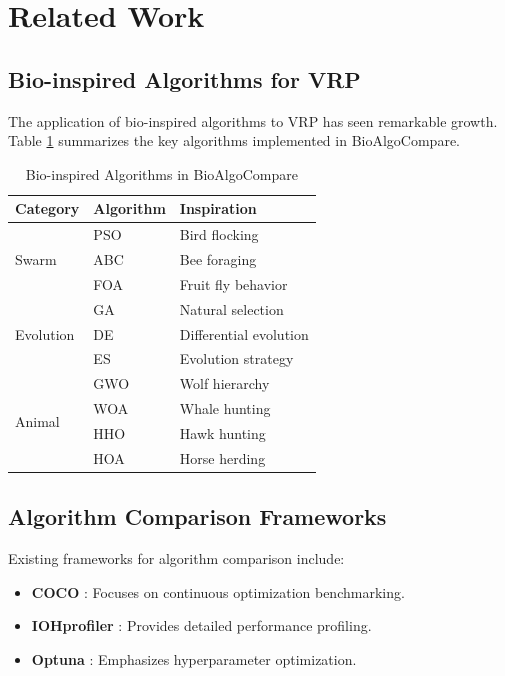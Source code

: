 \documentclass[conference]{IEEEtran}
\begin{document}
\section{Related Work}
\label{sec:related}

\subsection{Bio-inspired Algorithms for VRP}

The application of bio-inspired algorithms to VRP has seen remarkable growth. Table \ref{tab:algorithms} summarizes the key algorithms implemented in BioAlgoCompare.

\begin{table}[htbp]
\caption{Bio-inspired Algorithms in BioAlgoCompare}
\label{tab:algorithms}
\centering
\begin{tabular}{lll}
\toprule
\textbf{Category} & \textbf{Algorithm} & \textbf{Inspiration} \\
\midrule
\multirow{3}{*}{Swarm} & PSO \cite{kennedy1995particle} & Bird flocking \\
& ABC \cite{karaboga2007powerful} & Bee foraging \\
& FOA \cite{pan2012fruit} & Fruit fly behavior \\
\midrule
\multirow{3}{*}{Evolution} & GA \cite{holland1992adaptation} & Natural selection \\
& DE \cite{storn1997differential} & Differential evolution \\
& ES \cite{beyer2002evolution} & Evolution strategy \\
\midrule
\multirow{4}{*}{Animal} & GWO \cite{mirjalili2014grey} & Wolf hierarchy \\
& WOA \cite{mirjalili2016whale} & Whale hunting \\
& HHO \cite{heidari2019harris} & Hawk hunting \\
& HOA \cite{mohammad2022horse} & Horse herding \\
\bottomrule
\end{tabular}
\end{table}

\subsection{Algorithm Comparison Frameworks}

Existing frameworks for algorithm comparison include:

\begin{itemize}
    \item \textbf{COCO} \cite{hansen2021coco}: Focuses on continuous optimization benchmarking.
    \item \textbf{IOHprofiler} \cite{doerr2018iohprofiler}: Provides detailed performance profiling.
    \item \textbf{Optuna} \cite{akiba2019optuna}: Emphasizes hyperparameter optimization.
\end{itemize}
\end{document}
